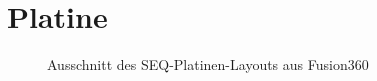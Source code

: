 \section{Platine}
\begin{figure}[h]
	\centering
	\setlength{\fboxsep}{1pt} %
	\setlength{\fboxrule}{1pt} %
	\caption{Ausschnitt des SEQ-Platinen-Layouts aus Fusion360}
	\label{fig:PCB_SEQ}
\end{figure}
\FloatBarrier
\newpage

